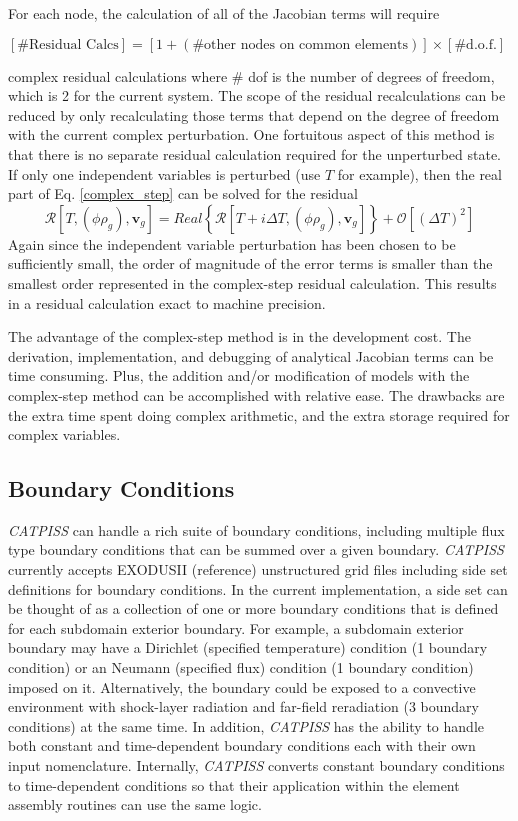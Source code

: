For each node, the calculation of all of the Jacobian terms will require
\begin{center}
$\left[\text{\# Residual Calcs}\right] = \left[1 + \left(\text{\# other nodes on common elements}\right)\right]\times\left[ \text{\# d.o.f.} \right]$
\end{center}
complex residual calculations where \# dof is the number of degrees of freedom, which is 2 for the current system.  The scope of the residual recalculations can be reduced by only recalculating those terms that depend on the degree of freedom with the current complex perturbation.  One fortuitous aspect of this method is that there is no separate residual calculation required for the unperturbed state.  If only one independent variables is perturbed (use $T$ for example), then the real part of Eq. \ref{complex_step} can be solved for the residual
\begin{equation}
  \mathcal{R}\left[T,\left(\phi \rho_{g} \right),\mathbf{v}_g\right] = Real\left\{\mathcal{R}\left[T+i\Delta T,\left(\phi \rho_{g} \right),\mathbf{v}_g \right] \right\} + \mathcal{O}\left[\left(\Delta T \right)^{2} \right]
\end{equation}
Again since the independent variable perturbation has been chosen to be sufficiently small, the order of magnitude of the error terms is smaller than the smallest order represented in the complex-step residual calculation.  This results in a residual calculation exact to machine precision.

The advantage of the complex-step method is in the development cost.  The derivation, implementation, and debugging of analytical Jacobian terms can be time consuming.  Plus, the addition and/or modification of models with the complex-step method can be accomplished with relative ease.  The drawbacks are the extra time spent doing complex arithmetic, and the extra storage required for complex variables. 

\subsection{Boundary Conditions}
\textit{CATPISS} can handle a rich suite of boundary conditions, including multiple flux type boundary conditions that can be summed over a given boundary.  \textit{CATPISS} currently accepts EXODUSII (reference) unstructured grid files including side set definitions for boundary conditions.  In the current implementation, a side set can be thought of as a collection of one or more boundary conditions that is defined for each subdomain exterior boundary.  For example, a subdomain exterior boundary may have a Dirichlet (specified temperature) condition (1 boundary condition) or an Neumann (specified flux) condition (1 boundary condition) imposed on it.  Alternatively, the boundary could be exposed to a convective environment with shock-layer radiation and far-field reradiation (3 boundary conditions) at the same time.  In addition, \textit{CATPISS} has the ability to handle both constant and time-dependent boundary conditions each with their own input nomenclature.  Internally, \textit{CATPISS} converts constant boundary conditions to time-dependent conditions so that their application within the element assembly routines can use the same logic.
